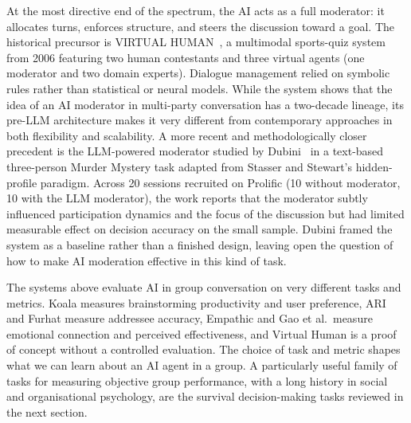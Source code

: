 At the most directive end of the spectrum, the AI acts as a full moderator: it allocates turns, enforces structure, and steers the discussion toward a goal. The historical precursor is VIRTUAL HUMAN~\cite{wahlster2023virtual}, a multimodal sports-quiz system from 2006 featuring two human contestants and three virtual agents (one moderator and two domain experts). Dialogue management relied on symbolic rules rather than statistical or neural models. While the system shows that the idea of an AI moderator in multi-party conversation has a two-decade lineage, its pre-LLM architecture makes it very different from contemporary approaches in both flexibility and scalability. A more recent and methodologically closer precedent is the LLM-powered moderator studied by Dubini~\cite{dubini2024multiuser} in a text-based three-person Murder Mystery task adapted from Stasser and Stewart's hidden-profile paradigm. Across 20 sessions recruited on Prolific (10 without moderator, 10 with the LLM moderator), the work reports that the moderator subtly influenced participation dynamics and the focus of the discussion but had limited measurable effect on decision accuracy on the small sample. Dubini framed the system as a baseline rather than a finished design, leaving open the question of how to make AI moderation effective in this kind of task.

The systems above evaluate AI in group conversation on very different tasks and metrics. Koala measures brainstorming productivity and user preference, ARI and Furhat measure addressee accuracy, Empathic and Gao et al.\ measure emotional connection and perceived effectiveness, and Virtual Human is a proof of concept without a controlled evaluation. The choice of task and metric shapes what we can learn about an AI agent in a group. A particularly useful family of tasks for measuring objective group performance, with a long history in social and organisational psychology, are the survival decision-making tasks reviewed in the next section.

